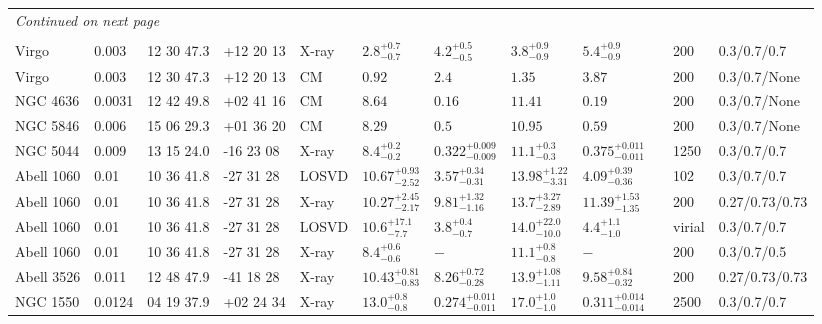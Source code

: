 \begin{landscape}
\begin{center}
{\begin{longtable}{llllllllllll}
\hline \multicolumn{8}{l}{\textit{Continued on next page}} \\
\endfoot
\\[-1.8ex] \hline 
\endlastfoot
Virgo & 0.003 & 12 30 47.3 & +12 20 13 & X-ray & ${2.8}^{+0.7}_{-0.7}$ & ${4.2}^{+0.5}_{-0.5}$ & ${3.8}^{+0.9}_{-0.9}$ & ${5.4}^{+0.9}_{-0.9}$ & \citet{MC99.1} & 200 & 0.3/0.7/0.7 \\
Virgo & 0.003 & 12 30 47.3 & +12 20 13 & CM & ${0.92}^{}_{}$ & ${2.4}^{}_{}$ & ${1.35}^{}_{}$ & ${3.87}^{}_{}$ & \citet{RI06.1} & 200 & 0.3/0.7/None \\
NGC 4636 & 0.0031 & 12 42 49.8 & +02 41 16 & CM & ${8.64}^{}_{}$ & ${0.16}^{}_{}$ & ${11.41}^{}_{}$ & ${0.19}^{}_{}$ & \citet{RI06.1} & 200 & 0.3/0.7/None \\
NGC 5846 & 0.006 & 15 06 29.3 & +01 36 20 & CM & ${8.29}^{}_{}$ & ${0.5}^{}_{}$ & ${10.95}^{}_{}$ & ${0.59}^{}_{}$ & \citet{RI06.1} & 200 & 0.3/0.7/None \\
NGC 5044 & 0.009 & 13 15 24.0 & -16 23 08 & X-ray & ${8.4}^{+0.2}_{-0.2}$ & ${0.322}^{+0.009}_{-0.009}$ & ${11.1}^{+0.3}_{-0.3}$ & ${0.375}^{+0.011}_{-0.011}$ & \citet{GA06.1} & 1250 & 0.3/0.7/0.7 \\
Abell 1060 & 0.01 & 10 36 41.8 & -27 31 28 & LOSVD & ${10.67}^{+0.93}_{-2.52}$ & ${3.57}^{+0.34}_{-0.31}$ & ${13.98}^{+1.22}_{-3.31}$ & ${4.09}^{+0.39}_{-0.36}$ & \citet{WO10.1} & 102 & 0.3/0.7/0.7 \\
Abell 1060 & 0.01 & 10 36 41.8 & -27 31 28 & X-ray & ${10.27}^{+2.45}_{-2.17}$ & ${9.81}^{+1.32}_{-1.16}$ & ${13.7}^{+3.27}_{-2.89}$ & ${11.39}^{+1.53}_{-1.35}$ & \citet{BA14.1} & 200 & 0.27/0.73/0.73 \\
Abell 1060 & 0.01 & 10 36 41.8 & -27 31 28 & LOSVD & ${10.6}^{+17.1}_{-7.7}$ & ${3.8}^{+0.4}_{-0.7}$ & ${14.0}^{+22.0}_{-10.0}$ & ${4.4}^{+1.1}_{-1.0}$ & \citet{LO06.1} & virial & 0.3/0.7/0.7 \\
Abell 1060 & 0.01 & 10 36 41.8 & -27 31 28 & X-ray & ${8.4}^{+0.6}_{-0.6}$ & ${-}^{}_{}$ & ${11.1}^{+0.8}_{-0.8}$ & ${-}^{}_{}$ & \citet{XU01.1} & 200 & 0.3/0.7/0.5 \\
Abell 3526 & 0.011 & 12 48 47.9 & -41 18 28 & X-ray & ${10.43}^{+0.81}_{-0.83}$ & ${8.26}^{+0.72}_{-0.28}$ & ${13.9}^{+1.08}_{-1.11}$ & ${9.58}^{+0.84}_{-0.32}$ & \citet{BA14.1} & 200 & 0.27/0.73/0.73 \\
NGC 1550 & 0.0124 & 04 19 37.9 & +02 24 34 & X-ray & ${13.0}^{+0.8}_{-0.8}$ & ${0.274}^{+0.011}_{-0.011}$ & ${17.0}^{+1.0}_{-1.0}$ & ${0.311}^{+0.014}_{-0.014}$ & \citet{GA06.1} & 2500 & 0.3/0.7/0.7 \\

\end{longtable}}
\end{center}
\end{landscape}
